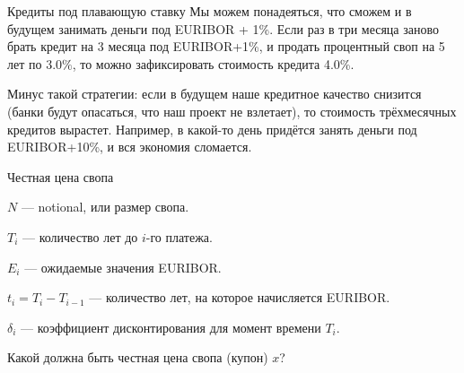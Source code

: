 \documentclass{beamer}
\begin{document}
\begin{frame}{Кредиты под плавающую ставку}
\justify
Мы можем понадеяться, что сможем и в будущем занимать деньги под EURIBOR + 1\%. Если раз в три месяца заново брать кредит на 3 месяца под EURIBOR+1\%, и продать процентный своп на 5 лет по $3.0\%$, то можно зафиксировать стоимость кредита 4.0\%.

\justify
Минус такой стратегии: если в будущем наше кредитное качество снизится (банки будут опасаться, что наш проект не взлетает), то стоимость трёхмесячных кредитов вырастет. Например, в какой-то день придётся занять деньги под EURIBOR+10\%, и вся экономия сломается.
\end{frame}



\begin{frame}{Честная цена свопа}
\centering
{}

\justify
$N$ --- notional, или размер свопа.

$T_i$ --- количество лет до $i$-го платежа.

$E_i$ --- ожидаемые значения EURIBOR.

$t_i = T_i - T_{i-1}$ --- количество лет, на которое начисляется EURIBOR.

$\delta_i$ --- коэффициент дисконтирования для момент времени $T_i$.

\justify
Какой должна быть честная цена свопа (купон) $x$?
\end{frame}
\end{document}
